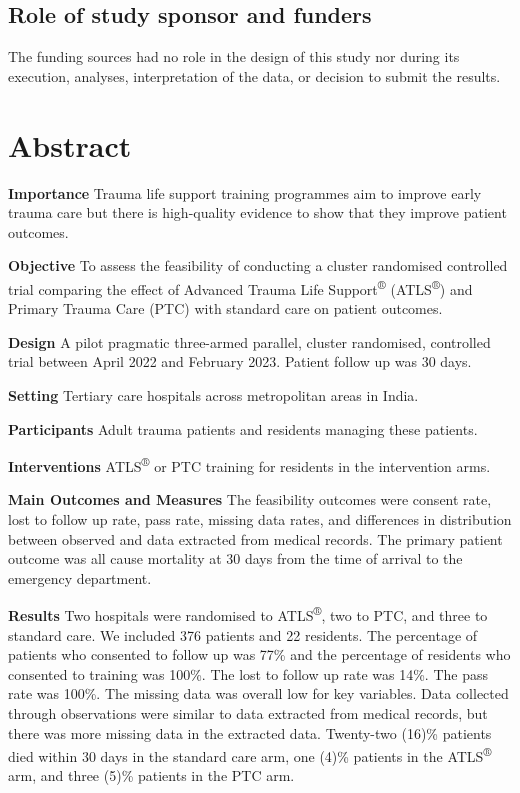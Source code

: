 \documentclass[
]{article}
\begin{document}
\hypertarget{role-of-study-sponsor-and-funders}{%
\subsection{Role of study sponsor and funders}\label{role-of-study-sponsor-and-funders}}

The funding sources had no role in the design of this study nor during its execution, analyses, interpretation of the data, or decision to submit the results.

\hypertarget{abstract}{%
\section{Abstract}\label{abstract}}

\textbf{Importance} Trauma life support training programmes aim to improve early trauma care but there is high-quality evidence to show that they improve patient outcomes.

\textbf{Objective} To assess the feasibility of conducting a cluster randomised controlled trial comparing the effect of Advanced Trauma Life Support\textsuperscript{®} (ATLS\textsuperscript{®}) and Primary Trauma Care (PTC) with standard care on patient outcomes.

\textbf{Design} A pilot pragmatic three-armed parallel, cluster randomised, controlled trial between April 2022 and February 2023. Patient follow up was 30 days.

\textbf{Setting} Tertiary care hospitals across metropolitan areas in India.

\textbf{Participants} Adult trauma patients and residents managing these patients.

\textbf{Interventions} ATLS\textsuperscript{®} or PTC training for residents in the intervention arms.

\textbf{Main Outcomes and Measures} The feasibility outcomes were consent rate, lost to follow up rate, pass rate, missing data rates, and differences in distribution between observed and data extracted from medical records. The primary patient outcome was all cause mortality at 30 days from the time of arrival to the emergency department.

\textbf{Results} Two hospitals were randomised to ATLS\textsuperscript{®}, two to PTC, and three to standard care. We included 376 patients and 22 residents. The percentage of patients who consented to follow up was 77\% and the percentage of residents who consented to training was 100\%. The lost to follow up rate was 14\%. The pass rate was 100\%. The missing data was overall low for key variables. Data collected through observations were similar to data extracted from medical records, but there was more missing data in the extracted data. Twenty-two (16)\% patients died within 30 days in the standard care arm, one (4)\% patients in the ATLS\textsuperscript{®} arm, and three (5)\% patients in the PTC arm.
\end{document}

